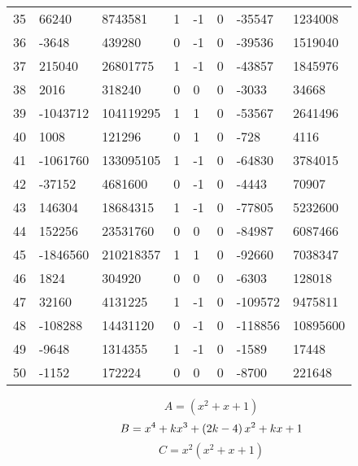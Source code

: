 \documentclass{amsart}
\begin{document}
\begin{longtable}{|l|l|l|lllll|}
35&66240&8743581&1&-1&0&-35547&1234008\\
36&-3648&439280&0&-1&0&-39536&1519040\\
37&215040&26801775&1&-1&0&-43857&1845976\\
38&2016&318240&0&0&0&-3033&34668\\
39&-1043712&104119295&1&1&0&-53567&2641496\\
40&1008&121296&0&1&0&-728&4116\\
41&-1061760&133095105&1&-1&0&-64830&3784015\\
42&-37152&4681600&0&-1&0&-4443&70907\\
43&146304&18684315&1&-1&0&-77805&5232600\\
44&152256&23531760&0&0&0&-84987&6087466\\
45&-1846560&210218357&1&1&0&-92660&7038347\\
46&1824&304920&0&0&0&-6303&128018\\
47&32160&4131225&1&-1&0&-109572&9475811\\
48&-108288&14431120&0&-1&0&-118856&10895600\\
49&-9648&1314355&1&-1&0&-1589&17448\\
50&-1152&172224&0&0&0&-8700&221648\\
\hline
\end{longtable}
$$A=(x^2
 + x
 + 1)$$
$$B=x^4
 + k\*x^3
 + \left(2\*k
 - 4\right) \*x^2
 + k\*x
 + 1$$
$$C=x^2(x^2
 + x
 + 1)$$
\end{document}
